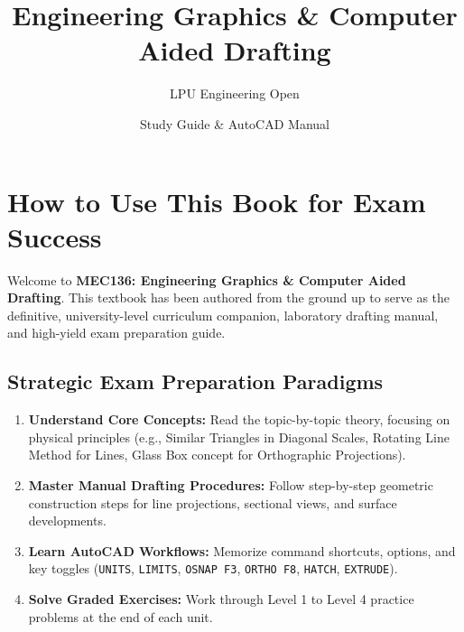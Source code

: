 \documentclass[a4paper,11pt,oneside,openany]{book}
\title{Engineering Graphics \& Computer Aided Drafting}
\author{LPU Engineering Open}
\date{Study Guide \& AutoCAD Manual}
\begin{document}
\frontmatter

\makebookcover
\copyrightpage
\disclaimerpage
\chapter*{How to Use This Book for Exam Success}

\noindent Welcome to \textbf{MEC136: Engineering Graphics \& Computer Aided Drafting}. This textbook has been authored from the ground up to serve as the definitive, university-level curriculum companion, laboratory drafting manual, and high-yield exam preparation guide.

\section*{Strategic Exam Preparation Paradigms}

\begin{tcolorbox}[enhanced, colback=boxtealbg, colframe=brandteal, title={\textbf{Scenario A: Full Semester Study Strategy (Maximum Marks + Mastery)}}, boxrule=1.2pt]
\begin{enumerate}
    \item \textbf{Understand Core Concepts:} Read the topic-by-topic theory, focusing on physical principles (e.g., Similar Triangles in Diagonal Scales, Rotating Line Method for Lines, Glass Box concept for Orthographic Projections).
    \item \textbf{Master Manual Drafting Procedures:} Follow step-by-step geometric construction steps for line projections, sectional views, and surface developments.
    \item \textbf{Learn AutoCAD Workflows:} Memorize command shortcuts, options, and key toggles (\texttt{UNITS}, \texttt{LIMITS}, \texttt{OSNAP F3}, \texttt{ORTHO F8}, \texttt{HATCH}, \texttt{EXTRUDE}).
    \item \textbf{Solve Graded Exercises:} Work through Level 1 to Level 4 practice problems at the end of each unit.
\end{enumerate}
\end{tcolorbox}
\end{document}
